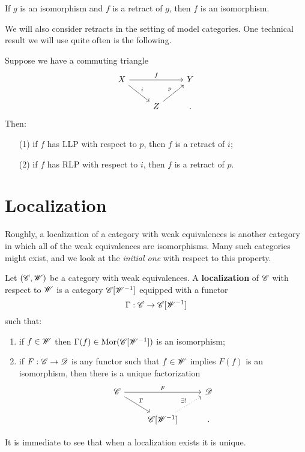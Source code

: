 \documentclass[11pt]{amsart}
\begin{document}
\begin{lem}
If $g$ is an isomorphism and $f$ is a retract of $g$, then $f$ is an isomorphism. 
\end{lem}

We will also consider retracts in the setting of model categories. 
One technical result we will use quite often is the following. 
 
\begin{prop}
Suppose we have a commuting triangle
\[
\begin{tikzcd}
X \ar[rr,"f"] \ar[dr,"i"] & & Y \\
& Z \ar[ur, "p"] & .
\end{tikzcd}
\]
Then:
\begin{enumerate}
\item[(1)] 
if $f$ has LLP with respect to $p$, then $f$ is a retract of $i$;
\item[(2)] if $f$ has RLP with respect to $i$, then $f$ is a retract of $p$. 
\end{enumerate}
\end{prop}

\section{Localization}

Roughly, a localization of a category with weak equivalences is another category in which all of the weak equivalences are isomorphisms. 
Many such categories might exist, and we look at the {\em initial one} with respect to this property. 

\begin{dfn}
Let $(\mathscr C, \mathscr W)$ be a category with weak equivalences. 
A {\bf localization} of $\mathscr C$ with respect to $\mathscr W$ is a category $\mathscr C[\mathscr W^{-1}]$ equipped with a functor
\[
\Gamma : \mathscr C \to \mathscr C[\mathscr W^{-1}]
\]
such that:
\begin{enumerate}
\item if $f \in \mathscr W$ then $\Gamma(f) \in {\rm Mor}(\mathscr C[\mathscr W^{-1}])$ is an isomorphism;
\item if $F : \mathscr C \to \mathscr D$ is any functor such that $f \in \mathscr W$ implies $F(f)$ is an isomorphism, then there is a unique factorization 
\[
\begin{tikzcd}
\sC \ar[rr, "F"] \ar[dr, "\Gamma"] & & \sD \\
& \sC[\sW^{-1}] \ar[ur, dotted, "\exists !"] & .
\end{tikzcd}
\] 
\end{enumerate}
\end{dfn}
It is immediate to see that when a localization exists it is unique. 
\end{document}
